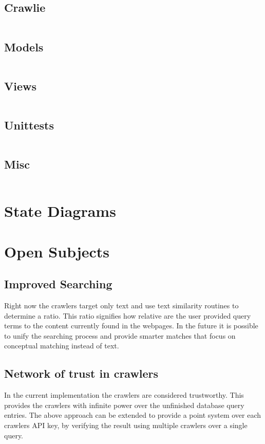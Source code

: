    \section{Crawlie}
    \inputminted[linenos,fontsize=\scriptsize,frame=leftline]{text}{files/crawlie}
    \section{Models}
    \inputminted[linenos,fontsize=\scriptsize,frame=leftline]{text}{files/models}
    \section{Views}
    \inputminted[linenos,fontsize=\scriptsize,frame=leftline]{text}{files/views}
    \section{Unittests}
    \inputminted[linenos,fontsize=\scriptsize,frame=leftline]{text}{files/unittests}
    \section{Misc}
    \inputminted[linenos,fontsize=\scriptsize,frame=leftline]{text}{files/tags}

\chapter{State Diagrams}

\chapter{Open Subjects}
    \section{Improved Searching}
        Right now the crawlers target only text and use text similarity
        routines to determine a ratio. This ratio signifies how relative are
        the user provided query terms to the content currently found in the
        webpages. In the future it is possible to unify the searching process
        and provide smarter matches that focus on conceptual matching instead
        of text.
    \section{Network of trust in crawlers}
        In the current implementation the crawlers are considered trustworthy.
        This provides the crawlers with infinite power over the unfinished
        database query entries. The above approach can be extended to provide
        a point system over each crawlers API key, by verifying the result
        using multiple crawlers over a single query.
